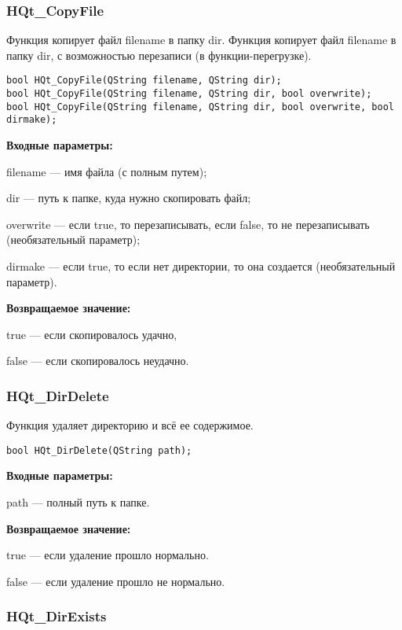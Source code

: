 \documentclass[a4paper,12pt]{article}
\begin{document}
\subsubsection{HQt\_CopyFile}\label{HQt_CopyFile}

Функция копирует файл filename в папку dir. Функция копирует файл filename в папку dir, с возможностью перезаписи (в функции-перегрузке).


\begin{lstlisting}[label=code_syntax_HQt_CopyFile,caption=Синтаксис]
bool HQt_CopyFile(QString filename, QString dir);
bool HQt_CopyFile(QString filename, QString dir, bool overwrite);
bool HQt_CopyFile(QString filename, QString dir, bool overwrite, bool dirmake);
\end{lstlisting}

\textbf{Входные параметры:}

filename --- имя файла (с полным путем);
 
dir --- путь к папке, куда нужно скопировать файл;

overwrite --- если true, то перезаписывать, если false, то не перезаписывать (необязательный параметр);

dirmake --- если true, то если нет директории, то она создается (необязательный параметр).

\textbf{Возвращаемое значение:}

true --- если скопировалось удачно,
 
false --- если скопировалось неудачно.


\subsubsection{HQt\_DirDelete}\label{HQt_DirDelete}

Функция удаляет директорию и всё ее содержимое.


\begin{lstlisting}[label=code_syntax_HQt_DirDelete,caption=Синтаксис]
bool HQt_DirDelete(QString path);
\end{lstlisting}

\textbf{Входные параметры:}

path --- полный путь к папке.

\textbf{Возвращаемое значение:}

true --- если удаление прошло нормально.

false ---  если удаление прошло не нормально.


\subsubsection{HQt\_DirExists}\label{HQt_DirExists}
\end{document}

